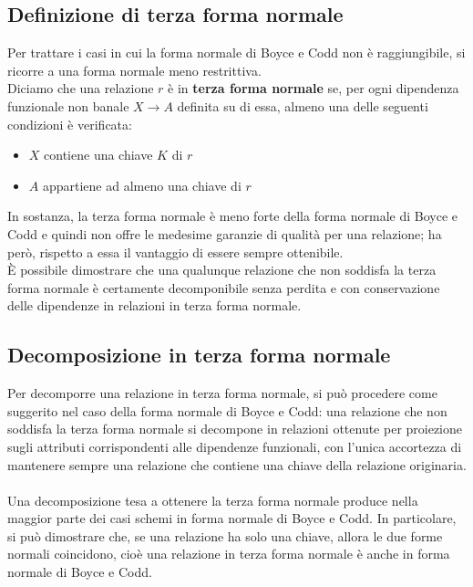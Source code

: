 \subsection{Definizione di terza forma normale}
Per trattare i casi in cui la forma normale di Boyce e Codd non è raggiungibile, si ricorre a una forma normale meno restrittiva.\\
Diciamo che una relazione $r$ è in \textbf{terza forma normale} se, per ogni dipendenza funzionale non banale $X \rightarrow A$ definita su di essa, almeno una delle seguenti condizioni è verificata:
    \begin{itemize}
        \item{$X$ contiene una chiave $K$ di $r$}
        \item{$A$ appartiene ad almeno una chiave di $r$}
    \end{itemize}
In sostanza, la terza forma normale è meno forte della forma normale di Boyce e Codd e quindi non offre le medesime garanzie di qualità per una relazione; ha però, rispetto a essa il vantaggio di essere sempre ottenibile.\\
È possibile dimostrare che una qualunque relazione che non soddisfa la terza forma normale è certamente decomponibile senza perdita e con conservazione delle dipendenze in relazioni in terza forma normale.

\subsection{Decomposizione in terza forma normale}
Per decomporre una relazione in terza forma normale, si può procedere come suggerito nel caso della forma normale di Boyce e Codd: una relazione che non soddisfa la terza forma normale si decompone in relazioni ottenute per proiezione sugli attributi corrispondenti alle dipendenze funzionali, con l'unica accortezza di mantenere sempre una relazione che contiene una chiave della relazione originaria.\\\\
Una decomposizione tesa a ottenere la terza forma normale produce nella maggior parte dei casi schemi in forma normale di Boyce e Codd. In particolare, si può dimostrare che, se una relazione ha solo una chiave, allora le due forme normali coincidono, cioè una relazione in terza forma normale è anche in forma normale di Boyce e Codd.

